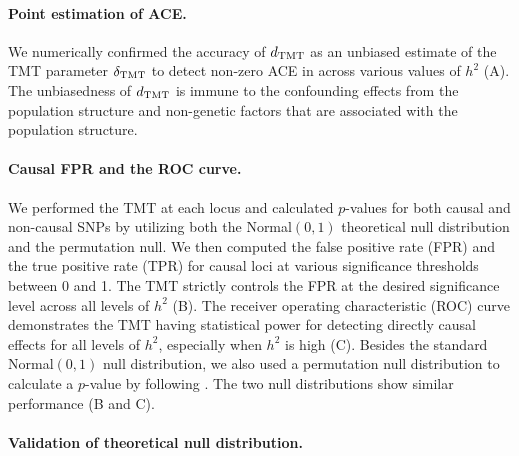 \documentclass[12pt]{extarticle}
\newcommand{\tmt}{{\normalfont \text{TMT}}}
\begin{document}
{%


\paragraph{Point estimation of ACE.}

We numerically confirmed the accuracy of $d_{\tmt}$ as an unbiased estimate of the TMT parameter $\delta_{\tmt}$ to detect non-zero ACE in  across various values of $h^2$ (A). The unbiasedness of $d_{\tmt}$ is immune to the confounding effects from the population structure and non-genetic factors that are associated with the population structure. 

\paragraph{Causal FPR and the ROC curve.}

We performed the TMT at each locus and calculated $p$-values for both causal and non-causal SNPs by utilizing both the Normal$(0,1)$ theoretical null distribution and the permutation null. We then computed the false positive rate (FPR) and the true positive rate (TPR) for causal loci at various significance thresholds between 0 and 1. The TMT strictly controls the FPR at the desired significance level across all levels of $h^2$ (B). The receiver operating characteristic (ROC) curve demonstrates the TMT having statistical power for detecting directly causal effects for all levels of $h^2$, especially when $h^2$ is high (C). Besides the standard Normal$(0,1)$ null distribution, we also used a permutation null distribution to calculate a $p$-value by following . The two null distributions show similar performance (B and C). 

\paragraph{Validation of theoretical null distribution.}

}
\end{document}
